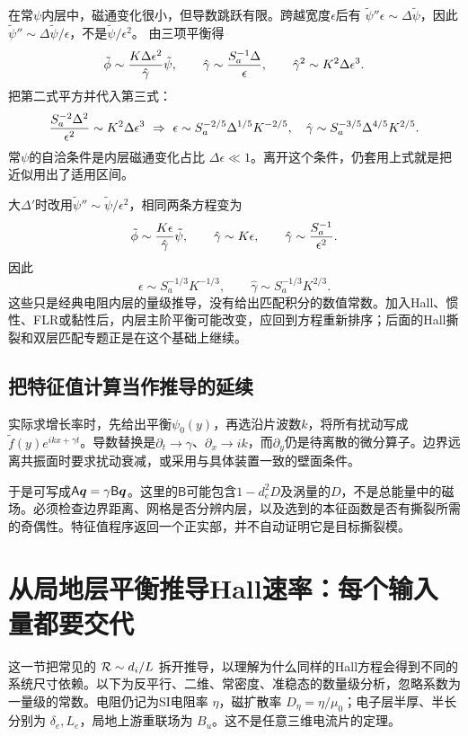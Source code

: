 \documentclass[UTF8,a4paper,11pt,openany,fontset=fandol]{ctexbook}
\begin{document}
在常$\psi$内层中，磁通变化很小，但导数跳跃有限。跨越宽度$\epsilon$后有
$\tilde\psi''\epsilon\sim\Delta\tilde\psi$，因此
$\tilde\psi''\sim\Delta\tilde\psi/\epsilon$，不是$\tilde\psi/\epsilon^2$。
由三项平衡得
\begin{equation}
 \tilde\phi\sim{K\Delta\epsilon^2\over\hat\gamma}\tilde\psi,\qquad
 \hat\gamma\sim{S_a^{-1}\Delta\over\epsilon},\qquad
 \hat\gamma^2\sim K^2\Delta\epsilon^3.
\end{equation}
把第二式平方并代入第三式：
\begin{equation}
 {S_a^{-2}\Delta^2\over\epsilon^2}
 \sim K^2\Delta\epsilon^3
 \ \Rightarrow\ 
 \epsilon\sim S_a^{-2/5}\Delta^{1/5}K^{-2/5},\quad
 \hat\gamma\sim S_a^{-3/5}\Delta^{4/5}K^{2/5}.
\end{equation}
常$\psi$的自洽条件是内层磁通变化占比
$\Delta\epsilon\ll1$。离开这个条件，仍套用上式就是把近似用出了适用区间。

大$\Delta'$时改用$\tilde\psi''\sim\tilde\psi/\epsilon^2$，相同两条方程变为
\begin{equation}
 \tilde\phi\sim{K\epsilon\over\hat\gamma}\tilde\psi,\qquad
 \hat\gamma\sim K\epsilon,\qquad
 \hat\gamma\sim{S_a^{-1}\over\epsilon^2}.
\end{equation}
因此
\begin{equation}
 \epsilon\sim S_a^{-1/3}K^{-1/3},\qquad
 \hat\gamma\sim S_a^{-1/3}K^{2/3}.
\end{equation}
这些只是经典电阻内层的量级推导，没有给出匹配积分的数值常数。加入Hall、惯性、FLR或黏性后，内层主阶平衡可能改变，应回到方程重新排序；后面的Hall撕裂和双层匹配专题正是在这个基础上继续。\citep{Baalrud2011,L262}

\subsection{把特征值计算当作推导的延续}
实际求增长率时，先给出平衡$\psi_0(y)$，再选沿片波数$k$，将所有扰动写成$\tilde f(y)e^{ikx+\gamma t}$。导数替换是$\partial_t\to\gamma$、$\partial_x\to ik$，而$\partial_y$仍是待离散的微分算子。边界远离共振面时要求扰动衰减，或采用与具体装置一致的壁面条件。

于是可写成$\mathsf A\bm{q}=\gamma\mathsf B\bm{q}$。这里的$\mathsf B$可能包含$1-d_e^2D$及涡量的$D$，不是总能量中的磁场。必须检查边界距离、网格是否分辨内层，以及选到的本征函数是否有撕裂所需的奇偶性。特征值程序返回一个正实部，并不自动证明它是目标撕裂模。


\section{从局地层平衡推导Hall速率：每个输入量都要交代}
这一节把常见的 $\mathcal R\sim d_i/L$ 拆开推导，以理解为什么同样的Hall方程会得到不同的系统尺寸依赖。以下为反平行、二维、常密度、准稳态的数量级分析，忽略系数为一量级的常数。电阻仍记为SI电阻率 $\eta$，磁扩散率 $D_\eta=\eta/\mu_0$；电子层半厚、半长分别为 $\delta_e,L_e$，局地上游重联场为 $B_u$。这不是任意三维电流片的定理。\citep{Malyshkin2008,Simakov2009}
\end{document}
